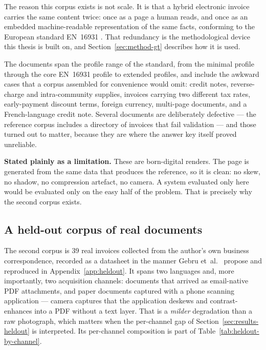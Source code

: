 

The reason this corpus exists is not scale. It is that a hybrid electronic invoice carries the
same content twice: once as a page a human reads, and once as an embedded machine-readable
representation of the same facts, conforming to the European standard \ac{EN}~16931
\parencite{en16931}. That redundancy is the methodological device this thesis is built on, and
Section~\ref{sec:method-gt} describes how it is used.

The documents span the profile range of the standard, from the minimal profile through the
core \ac{EN}~16931 profile to extended profiles, and include the awkward cases that a corpus
assembled for convenience would omit: credit notes, reverse-charge and intra-community
supplies, invoices carrying two different tax rates, early-payment discount terms, foreign
currency, multi-page documents, and a French-language credit note. Several documents are
deliberately defective --- the reference corpus includes a directory of invoices that fail
validation --- and those turned out to matter, because they are where the answer key itself
proved unreliable.

\textbf{Stated plainly as a limitation.} These are born-digital renders. The page is
generated from the same data that produces the reference, so it is clean: no skew, no
shadow, no compression artefact, no camera. A system evaluated only here would be evaluated
only on the easy half of the problem. That is precisely why the second corpus exists.

\subsection{A held-out corpus of real documents}

The second corpus is 39 real invoices collected from the author's own business
correspondence, recorded as a datasheet in the manner Gebru et~al.\ \parencite{gebru2018datasheets}
propose and reproduced in Appendix~\ref{app:heldout}. It spans two
languages and, more importantly, two acquisition channels: documents that arrived as
email-native \ac{PDF} attachments, and paper documents captured with a phone scanning
application --- camera captures that the application deskews and contrast-enhances into a
\ac{PDF} without a text layer. That is a \emph{milder} degradation than a raw photograph,
which matters when the per-channel gap of Section~\ref{sec:results-heldout} is interpreted. Its
per-channel composition is part of Table~\ref{tab:heldout-by-channel}.

